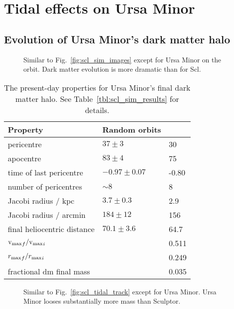 \section{Tidal effects on Ursa Minor}\label{tidal-effects-on-ursa-minor}

\subsection{Evolution of Ursa Minor's dark matter
halo}\label{evolution-of-ursa-minors-dark-matter-halo}

\begin{figure}
\centering
{}
\caption[Ursa Minor simulation snapshots]{Similar to
Fig.~\ref{fig:scl_sim_images} except for Ursa Minor on the \smallperi{}
orbit. Dark matter evolution is more dramatic than for
Scl.}\label{fig:umi_sim_images}
\end{figure}

\begin{table*}[t]
\centering
\caption[Simulation results for Ursa Minor’s dark matter]{The present-day properties for Ursa Minor’s final dark matter halo. See Table \ref{tbl:scl_sim_results} for details. }
\label{tbl:umi_sim_results}
\begin{tabular}{lll}
\toprule
Property & Random orbits & \smallperi{}\\
\midrule
pericentre & $37\pm3$ & 30\\
apocentre & $83 \pm 4$ & 75\\
time of last pericentre & $-0.97 \pm 0.07$ & -0.80\\
number of pericentres & $\sim 8$ & 8\\
Jacobi radius / kpc & $3.7 \pm 0.3$ & 2.9\\
Jacobi radius / arcmin & $184 \pm 12$ & 156\\
final heliocentric distance & $70.1 \pm 3.6$ & 64.7\\
${{\rm v}_{\rm max}}_f / {{\rm v}_{\rm max}}_i$ &  & 0.511\\
${r_{\rm max}}_f / {r_{\rm max}}_i$ &  & 0.249\\
fractional dm final mass &  & 0.035\\
\bottomrule
\end{tabular}
\end{table*}

\begin{figure}
\centering
{}
\caption[Ursa Minor tidal tracks]{Similar to
Fig.~\ref{fig:scl_tidal_track} except for Ursa Minor. Ursa Minor looses
substantially more mass than Sculptor.}\label{fig:umi_tidal_track}
\end{figure}

